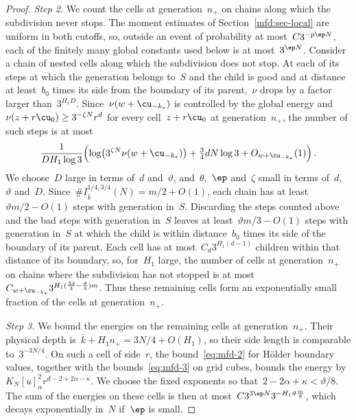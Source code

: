 \documentclass[11pt]{amsart}
\begin{document}
\begin{proof}
\emph{Step 2.} We count the cells at generation~$n_+$ on chains along which the subdivision never stops. The moment estimates of Section~\ref{mfd:sec-local} are uniform in both cutoffs, so, outside an event of probability at most~$C3^{-p\ep N}$, each of the finitely many global constants used below is at most~$3^{\ep N}$. Consider a chain of nested cells along which the subdivision does not stop. At each of its steps at which the generation belongs to~$S$ and the child is good and at distance at least~$b_0$ times its side from the boundary of its parent,~$\nu$ drops by a factor larger than~$3^{H_1D}$. Since~$\nu(w+\cu_{-k_*})$ is controlled by the global energy and~$\nu(z+r\cu_0)\geq3^{-\zeta N}r^d$ for every cell~$z+r\cu_0$ at generation~$n_+$, the number of such steps is at most
\begin{equation*}
	\frac1{DH_1\log3}\Bigl(\log\bigl(3^{\zeta N}\nu(w+\cu_{-k_*})\bigr)
	+\tfrac34 dN\log3+O_{w+\cu_{-k_*}}(1)\Bigr)\,.
\end{equation*}
We choose~$D$ large in terms of~$d$ and~$\vartheta$, and~$\theta$,~$\ep$ and~$\zeta$ small in terms of~$d$,~$\vartheta$ and~$D$. Since~$\#I_{\bar k}^{1/4,3/4}(N)=m/2+O(1)$, each chain has at least~$\vartheta m/2-O(1)$ steps with generation in~$S$. Discarding the steps counted above and the bad steps with generation in~$S$ leaves at least~$\vartheta m/3-O(1)$ steps with generation in~$S$ at which the child is within distance~$b_0$ times its side of the boundary of its parent. Each cell has at most~$C_d3^{H_1(d-1)}$ children within that distance of its boundary, so, for~$H_1$ large, the number of cells at generation~$n_+$ on chains where the subdivision has not stopped is at most~$C_{w+\cu_{-k_*}}3^{H_1(\frac{3d}{4}-\frac{\vartheta}{4})m}$. Thus these remaining cells form an exponentially small fraction of the cells at generation~$n_+$.

\smallskip

\emph{Step 3.} We bound the energies on the remaining cells at generation~$n_+$. Their physical depth is~$\bar k+H_1n_+=3N/4+O(H_1)$, so their side length is comparable to~$3^{-3N/4}$. On such a cell of side~$r$, the bound~\eqref{eq:mfd-2} for H\"older boundary values, together with the bounds~\eqref{eq:mfd-3} on grid cubes, bounds the energy by~$K_N[u]_\alpha^2r^{d-2+2\alpha-\kappa}$. We choose the fixed exponents so that~$2-2\alpha+\kappa<\vartheta/8$. The sum of the energies on these cells is then at most~$C3^{3\ep N}3^{-H_1\vartheta \frac{m}{8}}$, which decays exponentially in~$N$ if~$\ep$ is small.


\end{proof}
\end{document}
